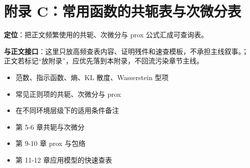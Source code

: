 \chapter{附录 C：常用函数的共轭表与次微分表}

\label{app:c}

\begin{introduction}[内容提要]
        \item \textbf{定位}：把正文频繁使用的共轭、次微分与 prox 公式汇成可查询表。
\item \textbf{与正文接口}：这里只放高频查表内容、证明残件和速查模板，不承担主线叙事。；正文若标记“放附录”，应优先落到本附录，不回流污染章节主线。
      \end{introduction}

\begin{definition}[收录范围]
        \begin{itemize}
  \item 范数、指示函数、熵、KL 散度、Wasserstein 型项
  \item 常见正则项的共轭、次微分与 prox
  \item 在不同环境层级下的适用条件备注
\end{itemize}
        \end{definition}

\begin{example}[使用时机]
        \begin{itemize}
  \item 第 5-6 章共轭与次微分
  \item 第 9-10 章 prox 与包络
  \item 第 11-12 章应用模型的快速查表
\end{itemize}
        \end{example}
